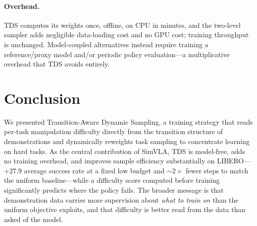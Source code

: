 \documentclass[letterpaper]{article} %
\newcommand{\tds}{TDS}
\begin{document}
\paragraph{Overhead.}
\tds{} computes its weights once, offline, on CPU in minutes, and the two-level sampler adds negligible data-loading cost and no GPU cost; training throughput is unchanged. Model-coupled alternatives instead require training a reference/proxy model and/or periodic policy evaluation---a multiplicative overhead that \tds{} avoids entirely.

\section{Conclusion}
We presented Transition-Aware Dynamic Sampling, a training strategy that reads per-task manipulation difficulty directly from the transition structure of demonstrations and dynamically reweights task sampling to concentrate learning on hard tasks. As the central contribution of SimVLA, \tds{} is model-free, adds no training overhead, and improves sample efficiency substantially on LIBERO---$+27.9$ average success rate at a fixed low budget and $\sim\!2\times$ fewer steps to match the uniform baseline---while a difficulty score computed before training significantly predicts where the policy fails. The broader message is that demonstration data carries more supervision about \emph{what to train on} than the uniform objective exploits, and that difficulty is better read from the data than asked of the model.


\end{document}
